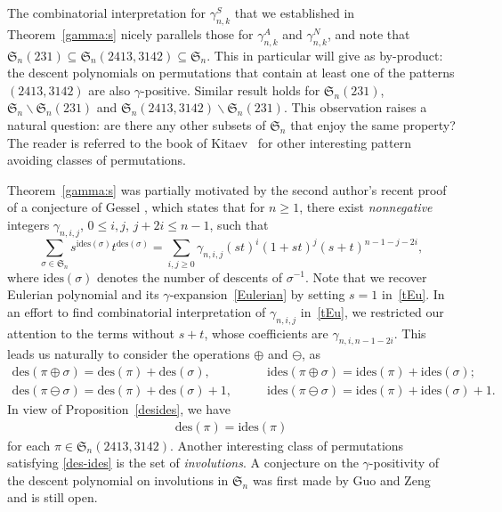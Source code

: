 \documentclass[12pt]{amsart}
\numberwithin{equation}{section}
\theoremstyle{plain}
\theoremstyle{definition}
\def\des{\mathrm{des}}
\def\S{\mathfrak{S}}
\def\ides{\mathrm{ides}}
\begin{document}
 The combinatorial interpretation for $\gamma_{n,k}^S$ that we established in Theorem~\ref{gamma:s} nicely parallels those for $\gamma_{n,k}^A$ and $\gamma_{n,k}^N$, and note that $\S_n(231)\subseteq\S_n(2413,3142)\subseteq\S_n$. This in particular will give as by-product: the descent polynomials on permutations that contain at least one of the patterns $(2413,3142)$ are also $\gamma$-positive. Similar result holds for  $\S_n(231)$, $\S_n\backslash\S_n(231)$ and $\S_n(2413,3142)\backslash\S_n(231)$. This observation raises a natural question: are there any other subsets  of $\S_n$ that enjoy the same property? The reader is referred to the book of Kitaev~\cite{ki} for other interesting pattern avoiding classes of permutations.



Theorem~\ref{gamma:s} was partially motivated  by the second author's recent proof~\cite{lin} of 
a conjecture of 
Gessel \cite{br},  which  states that for $n\geq 1$, there exist \emph{nonnegative} integers $\gamma_{n,i,j}$, $0\leq i,j$, $j+2i\leq n-1$, such that 
\begin{equation}
\label{tEu}
\sum_{\sigma\in \S_n}s^{\ides(\sigma)}t^{\des(\sigma)}
= \sum_{i,j\geq 0}\gamma_{n,i,j}(st)^i(1+st)^j(s+t)^{n-1-j-2i},
\end{equation}
where $\ides(\sigma)$ denotes the number of descents of $\sigma^{-1}$.
Note that we recover Eulerian polynomial and its $\gamma$-expansion~\eqref{Eulerian} by 
setting $s=1$ in~\eqref{tEu}. 
In an effort to find combinatorial interpretation of $\gamma_{n,i,j}$ in~\eqref{tEu}, we restricted our attention to the terms without $s+t$, whose coefficients are $\gamma_{n,i,n-1-2i}$. This  leads us naturally to consider the operations $\oplus$ and $\ominus$, as 
 \begin{align*}
\des(\pi\oplus\sigma)=\des(\pi)+\des(\sigma),\qquad & \ides(\pi\oplus\sigma)=\ides(\pi)+\ides(\sigma);\\
\des(\pi\ominus\sigma)=\des(\pi)+\des(\sigma)+1,\qquad & \ides(\pi\ominus\sigma)=\ides(\pi)+\ides(\sigma)+1.
\end{align*}
In view of Proposition~\ref{desides}, we have 
\begin{align}\label{des-ides}
\des(\pi)=\ides(\pi)
\end{align}
for each $\pi\in\S_n(2413,3142)$.   Another  interesting 
class of permutations satisfying \eqref{des-ides}  is the set of  {\em involutions}.  A conjecture on the $\gamma$-positivity of the descent polynomial on involutions 
in $\S_n$ 
 was first made by Guo and Zeng~\cite{gz} and   is  still open.
 
\end{document}

